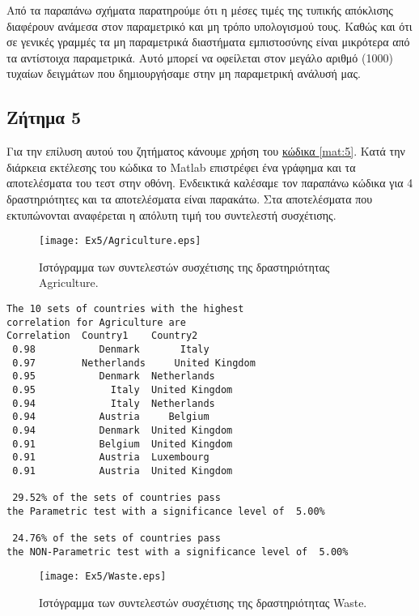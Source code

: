 \documentclass[11pt]{scrartcl} %
\begin{document}
Από τα παραπάνω σχήματα παρατηρούμε ότι η μέσες τιμές της τυπικής απόκλισης διαφέρουν ανάμεσα στον παραμετρικό και μη τρόπο υπολογισμού τους. Καθώς και ότι σε γενικές γραμμές τα μη παραμετρικά διαστήματα εμπιστοσύνης είναι μικρότερα από τα αντίστοιχα παραμετρικά. Αυτό μπορεί να οφείλεται στον μεγάλο αριθμό (1000) τυχαίων δειγμάτων που δημιουργήσαμε στην μη παραμετρική ανάλυσή μας.  

\subsection{Ζήτημα 5}
\label{subsec:z5}

Για την επίλυση αυτού του ζητήματος κάνουμε χρήση του \hyperref[mat:5]{κώδικα \ref*{mat:5}}. Κατά την διάρκεια εκτέλεσης του κώδικα το Matlab επιστρέφει ένα γράφημα και τα αποτελέσματα του τεστ στην οθόνη. Ενδεικτικά καλέσαμε τον παραπάνω κώδικα για 4 δραστηριότητες και τα αποτελέσματα είναι παρακάτω. Στα αποτελέσματα που εκτυπώνονται αναφέρεται η απόλυτη τιμή του συντελεστή συσχέτισης.




\begin{figure}[H]

	\centering
	\texttt{[image: Ex5/Agriculture.eps]}	
\caption{Ιστόγραμμα των συντελεστών συσχέτισης της δραστηριότητας Agriculture.}
\label{fig:z51} 
\end{figure}



\begin{Verbatim}[fontsize=\small]
The 10 sets of countries with the highest 
correlation for Agriculture are
Correlation	 Country1	 Country2
 0.98	 	    Denmark	      Italy 
 0.97	 	 Netherlands	 United Kingdom 
 0.95	 	    Denmark	 Netherlands 
 0.95	 	      Italy	 United Kingdom 
 0.94	 	      Italy	 Netherlands 
 0.94	 	    Austria	    Belgium 
 0.94	 	    Denmark	 United Kingdom 
 0.91	 	    Belgium	 United Kingdom 
 0.91	 	    Austria	 Luxembourg 
 0.91	 	    Austria	 United Kingdom 

 29.52% of the sets of countries pass 
the Parametric test with a significance level of  5.00%

 24.76% of the sets of countries pass 
the NON-Parametric test with a significance level of  5.00%
\end{Verbatim}



\begin{figure}[H]
 
	\centering
	\texttt{[image: Ex5/Waste.eps]}	
\caption{Ιστόγραμμα των συντελεστών συσχέτισης της δραστηριότητας Waste.}
\label{fig:z52}
\end{figure}
\end{document}
